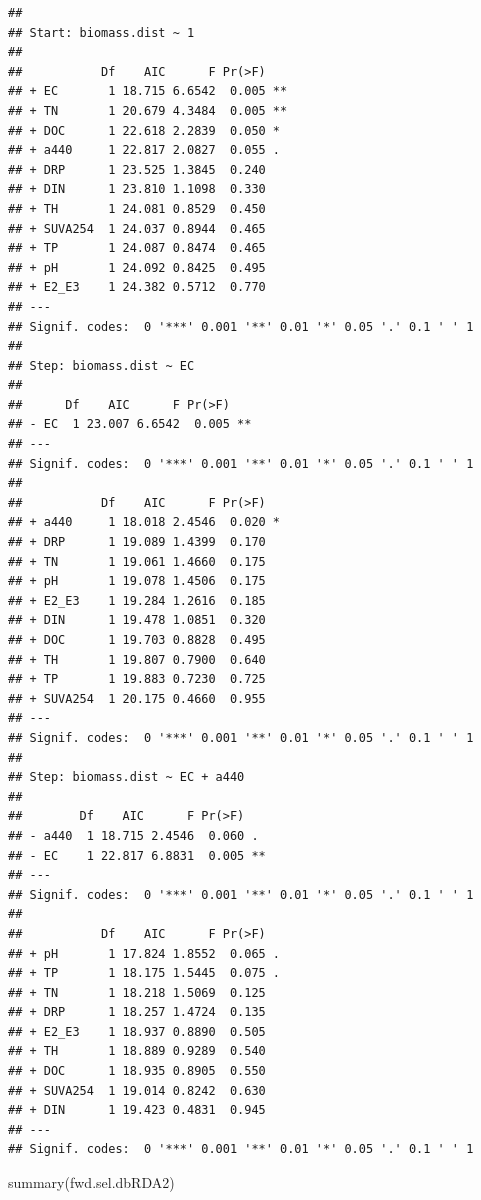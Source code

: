 \documentclass[
]{book}
\newenvironment{Shaded}{\begin{snugshade}}{\end{snugshade}}
\newcommand{\FunctionTok}[1]{\textcolor[rgb]{0.00,0.00,0.00}{#1}}
\newcommand{\NormalTok}[1]{#1}
\begin{document}
\begin{verbatim}
## 
## Start: biomass.dist ~ 1 
## 
##           Df    AIC      F Pr(>F)   
## + EC       1 18.715 6.6542  0.005 **
## + TN       1 20.679 4.3484  0.005 **
## + DOC      1 22.618 2.2839  0.050 * 
## + a440     1 22.817 2.0827  0.055 . 
## + DRP      1 23.525 1.3845  0.240   
## + DIN      1 23.810 1.1098  0.330   
## + TH       1 24.081 0.8529  0.450   
## + SUVA254  1 24.037 0.8944  0.465   
## + TP       1 24.087 0.8474  0.465   
## + pH       1 24.092 0.8425  0.495   
## + E2_E3    1 24.382 0.5712  0.770   
## ---
## Signif. codes:  0 '***' 0.001 '**' 0.01 '*' 0.05 '.' 0.1 ' ' 1
## 
## Step: biomass.dist ~ EC 
## 
##      Df    AIC      F Pr(>F)   
## - EC  1 23.007 6.6542  0.005 **
## ---
## Signif. codes:  0 '***' 0.001 '**' 0.01 '*' 0.05 '.' 0.1 ' ' 1
## 
##           Df    AIC      F Pr(>F)  
## + a440     1 18.018 2.4546  0.020 *
## + DRP      1 19.089 1.4399  0.170  
## + TN       1 19.061 1.4660  0.175  
## + pH       1 19.078 1.4506  0.175  
## + E2_E3    1 19.284 1.2616  0.185  
## + DIN      1 19.478 1.0851  0.320  
## + DOC      1 19.703 0.8828  0.495  
## + TH       1 19.807 0.7900  0.640  
## + TP       1 19.883 0.7230  0.725  
## + SUVA254  1 20.175 0.4660  0.955  
## ---
## Signif. codes:  0 '***' 0.001 '**' 0.01 '*' 0.05 '.' 0.1 ' ' 1
## 
## Step: biomass.dist ~ EC + a440 
## 
##        Df    AIC      F Pr(>F)   
## - a440  1 18.715 2.4546  0.060 . 
## - EC    1 22.817 6.8831  0.005 **
## ---
## Signif. codes:  0 '***' 0.001 '**' 0.01 '*' 0.05 '.' 0.1 ' ' 1
## 
##           Df    AIC      F Pr(>F)  
## + pH       1 17.824 1.8552  0.065 .
## + TP       1 18.175 1.5445  0.075 .
## + TN       1 18.218 1.5069  0.125  
## + DRP      1 18.257 1.4724  0.135  
## + E2_E3    1 18.937 0.8890  0.505  
## + TH       1 18.889 0.9289  0.540  
## + DOC      1 18.935 0.8905  0.550  
## + SUVA254  1 19.014 0.8242  0.630  
## + DIN      1 19.423 0.4831  0.945  
## ---
## Signif. codes:  0 '***' 0.001 '**' 0.01 '*' 0.05 '.' 0.1 ' ' 1
\end{verbatim}

\begin{Shaded}
\begin{Highlighting}[]
\FunctionTok{summary}\NormalTok{(fwd.sel.dbRDA2)}
\end{Highlighting}
\end{Shaded}
\end{document}
